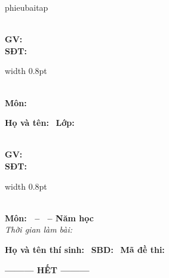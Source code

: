 \documentclass[11pt,a4paper]{article}
\begin{document}
\def\typept{phieubaitap}
\ifx\headertype\typept
\noindent
\begin{tcolorbox}[
    colback=blue!2!white,
    colframe=blue!80!black,
    arc=3mm,
    boxrule=1pt,
    left=6pt, right=6pt, top=5pt, bottom=5pt
]
\begin{minipage}[c]{0.43\linewidth}
\centering
{\large\bfseries\color{blue!85!black} \brandname}\\[3pt]
\textbf{GV: \giaovien}\\[2pt]
\textbf{SĐT: \sdt}
\end{minipage}%
\hfill
{\color{blue!60!black}\vrule width 0.8pt}%
\hfill
\begin{minipage}[c]{0.54\linewidth}
\centering
{\large\bfseries\color{red!85!black} \tenkythi}\\[2pt]
\textbf{Môn: \monhoc}\\[2pt]
\textit{\tieudetrai}
\end{minipage}

\vspace{3pt}
\tcbline
\vspace{2pt}
\noindent
\rule{0pt}{11pt}\textbf{Họ và tên:} \dotfill\ \textbf{Lớp:} \makebox[2.5cm]{\dotfill}
\end{tcolorbox}
\vspace{0.15cm}
\else
\noindent
\begin{tcolorbox}[
    colback=blue!2!white,
    colframe=blue!80!black,
    arc=3mm,
    boxrule=1pt,
    left=6pt, right=6pt, top=5pt, bottom=5pt
]
\begin{minipage}[c]{0.43\linewidth}
\centering
{\large\bfseries\color{blue!85!black} \brandname}\\[3pt]
\textbf{GV: \giaovien}\\[2pt]
\textbf{SĐT: \sdt}
\end{minipage}%
\hfill
{\color{blue!60!black}\vrule width 0.8pt}%
\hfill
\begin{minipage}[c]{0.54\linewidth}
\centering
{\large\bfseries\color{red!85!black} \tenkythi}\\[2pt]
\textbf{Môn: \monhoc\ifx\tentruong\empty\else\ -- \tentruong\fi\ -- Năm học \namhoc}\\[2pt]
\textit{Thời gian làm bài: \thoigian}
\end{minipage}

\vspace{3pt}
\tcbline
\vspace{2pt}
\noindent
\rule{0pt}{11pt}\textbf{Họ và tên thí sinh:} \dotfill\ \textbf{SBD:} \makebox[2.8cm]{\dotfill}\ \textbf{Mã đề thi: \made}
\end{tcolorbox}
\vspace{0.15cm}
\fi



\ifdefined\inbangdapan
\inbangdapan
\fi

\vspace{0.4cm}
\begin{center}
	\textbf{--------- HẾT ---------}
\end{center}
\end{document}
